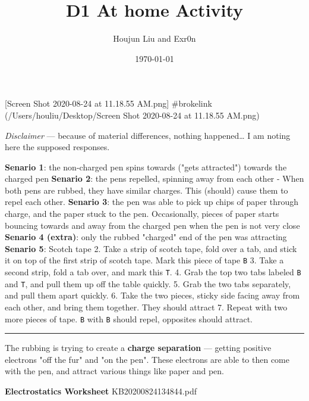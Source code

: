 \documentclass[letterpaper]{article}
\author{Houjun Liu and Exr0n}
\date{\today}
\title{D1 At home Activity}
\renewcommand\maketitle{}
\begin{document}
\maketitle
[Screen Shot 2020-08-24 at 11.18.55 AM.png] \#brokelink
(/Users/houliu/Desktop/Screen Shot 2020-08-24 at 11.18.55 AM.png)

\emph{Disclaimer} --- because of material differences, nothing happened\ldots{} I
am noting here the supposed responses.

\textbf{Senario 1}: the non-charged pen spins towards ("gets attracted")
towards the charged pen \textbf{Senario 2}: the pens repelled, spinning away
from each other - When both pens are rubbed, they have similar charges.
This (should) cause them to repel each other. \textbf{Senario 3}: the pen was
able to pick up chips of paper through charge, and the paper stuck to
the pen. Occasionally, pieces of paper starts bouncing towards and away
from the charged pen when the pen is not very close \textbf{Senario 4 (extra)}:
only the rubbed "charged" end of the pen was attracting \textbf{Senario 5}:
Scotch tape 2. Take a strip of scotch tape, fold over a tab, and stick
it on top of the first strip of scotch tape. Mark this piece of tape
\texttt{B} 3. Take a second strip, fold a tab over, and mark this \texttt{T}. 4. Grab
the top two tabs labeled \texttt{B} and \texttt{T}, and pull them up off the table
quickly. 5. Grab the two tabs separately, and pull them apart
quickly. 6. Take the two pieces, sticky side facing away from each
other, and bring them together. They should attract 7. Repeat with two
more pieces of tape. \texttt{B} with \texttt{B} should repel, opposites should
attract.

\noindent\rule{\textwidth}{0.5pt}

The rubbing is trying to create a \textbf{charge separation} --- getting
positive electrons "off the fur" and "on the pen". These electrons are
able to then come with the pen, and attract various things like paper
and pen.

\textbf{Electrostatics Worksheet} KB20200824134844.pdf
\end{document}
